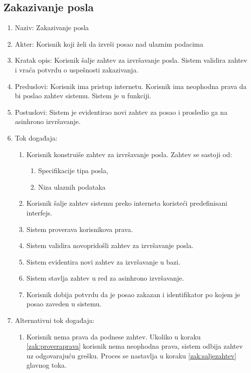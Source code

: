\documentclass[12pt,oneside]{memoir}
\begin{document}
\subsection{Zakazivanje posla}
\begin{enumerate}
\item Naziv: Zakazivanje posla
\item Akter: Korisnik koji želi da izvrši posao nad ulaznim podacima
\item Kratak opis: Korisnik šalje zahtev za izvršavanje posla. Sistem validira zahtev i vraća potvrdu o uspešnosti zakazivanja.
\item Preduslovi: Korisnik ima pristup internetu. Korisnik ima neophodna prava da bi poslao zahtev sistemu. Sistem je u funkciji.
\item Postuslovi: Sistem je evidentirao novi zahtev za posao i prosledio ga na asinhrono izvršavanje.
\item Tok događaja:
	\begin{enumerate}
	\item \label{zak:konstruisezahtev}Korisnik konstruiše zahtev za izvršavanje posla. Zahtev se sastoji od:
		\begin{enumerate}
		\item Specifikacije tipa posla,
		\item Niza ulaznih podataka
		\end{enumerate}
	\item \label{zak:saljezahtev} Korisnik šalje zahtev sistemu preko interneta koristeći predefinisani interfejs.
	\item \label{zak:proveraprava} Sistem proverava korisnikova prava.
	\item \label{zak:validacijazahteva} Sistem validira novopridošli zahtev za izvršavanje posla.
	\item Sistem evidentira novi zahtev za izvršavanje u bazi.
	\item \label{zak:asinhzakazivanje} Sistem stavlja zahtev u red za asinhrono izvršavanje.
	\item Korisnik dobija potvrdu da je posao zakazan i identifikator po kojem je posao zaveden u sistemu.
	\end{enumerate}
\item Alternativni tok događaja:
	\begin{enumerate}
	\item Korisnik nema prava da podnese zahtev. Ukoliko u koraku \ref{zak:proveraprava} korisnik nema neophodna prava, sistem odbija zahtev uz odgovarajuću grešku. Proces se nastavlja u koraku \ref{zak:saljezahtev} glavnog toka.

\end{enumerate}
\end{enumerate}
\end{document}
